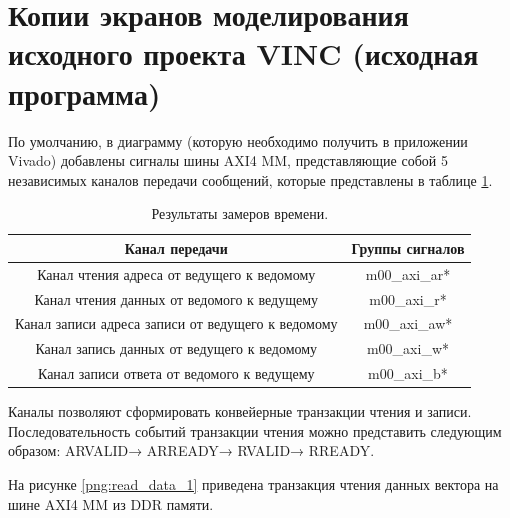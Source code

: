 \chapter*{Копии экранов моделирования исходного проекта VINC (исходная программа)}

По умолчанию, в диаграмму (которую необходимо получить в приложении Vivado) добавлены сигналы шины AXI4 MM, представляющие собой 5 независимых каналов передачи сообщений, которые представлены в таблице \ref{tab:t1}.

\begin{table}[h]
	\begin{center}
		\captionsetup{singlelinecheck = false, justification=raggedright}
		\caption{\label{tab:t1}Результаты замеров времени.}
		\begin{tabular}{|c|c|}
			\hline
			Канал передачи & Группы сигналов \\
			\hline
			Канал чтения адреса от ведущего к ведомому & m00\_axi\_ar* \\
			\hline
			Канал чтения данных от ведомого к ведущему & m00\_axi\_r* \\
			\hline
			Канал записи адреса записи от ведущего к ведомому & m00\_axi\_aw* \\
			\hline
			Канал запись данных от ведущего к ведомому & m00\_axi\_w* \\
			\hline
			Канал записи ответа от ведомого к ведущему & m00\_axi\_b* \\
			\hline
		\end{tabular}
	\end{center}
\end{table}

Каналы позволяют сформировать конвейерные транзакции чтения и записи. Последовательность событий транзакции чтения можно представить следующим образом: ARVALID→ ARREADY→ RVALID→ RREADY.

На рисунке \ref{png:read_data_1} приведена транзакция чтения данных вектора на шине AXI4 MM из DDR памяти.
\begin{figure}[H]
\end{figure}

